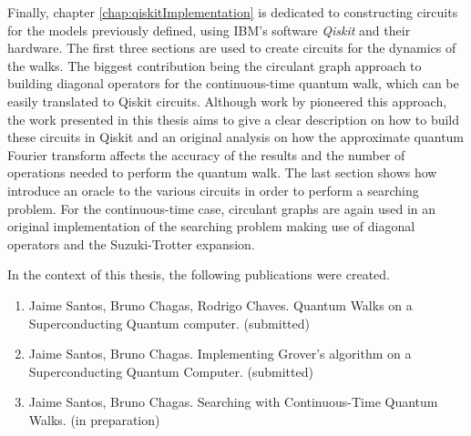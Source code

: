 \documentclass[../../dissertation.tex]{subfiles}
\begin{document}
Finally, chapter \ref{chap:qiskitImplementation} is dedicated to constructing
circuits for the models previously defined, using IBM's software
\textit{Qiskit} and their hardware. The first three sections are used to create
circuits for the dynamics of the walks. The biggest contribution being the
circulant graph approach to building diagonal operators for the continuous-time
quantum walk, which can be easily translated to Qiskit circuits. Although work
by \cite{qiang2016} pioneered this approach, the work presented in this thesis
aims to give a clear description on how to build these circuits in Qiskit and
an original analysis on how the approximate quantum Fourier transform affects
the accuracy of the results and the number of operations needed to perform the
quantum walk.
The last section shows how introduce an oracle to the various circuits in order
to perform a searching problem. For the continuous-time case, circulant graphs
are again used in an original implementation of the searching problem making
use of diagonal operators and the Suzuki-Trotter expansion.\par
In the context of this thesis, the following publications were created.
\begin{enumerate}
	\item Jaime Santos, Bruno Chagas, Rodrigo Chaves. Quantum Walks on a Superconducting Quantum computer. (submitted)
	\item Jaime Santos, Bruno Chagas. Implementing Grover's algorithm on a Superconducting Quantum Computer. (submitted)
	\item Jaime Santos, Bruno Chagas. Searching with Continuous-Time Quantum Walks. (in preparation)
	
\end{enumerate}
\end{document}

